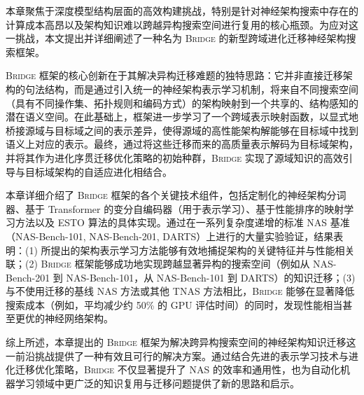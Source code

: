 \documentclass[../main.tex]{subfiles}
\begin{document}
\label{sec:bridge-conclusion}

本章聚焦于深度模型结构层面的高效构建挑战，特别是针对神经架构搜索中存在的计算成本高昂以及架构知识难以跨越异构搜索空间进行复用的核心瓶颈。为应对这一挑战，本文提出并详细阐述了一种名为 \textsc{Bridge} 的新型跨域进化迁移神经架构搜索框架。

\textsc{Bridge} 框架的核心创新在于其解决异构迁移难题的独特思路：它并非直接迁移架构的句法结构，而是通过引入统一的神经架构表示学习机制，将来自不同搜索空间（具有不同操作集、拓扑规则和编码方式）的架构映射到一个共享的、结构感知的潜在语义空间。在此基础上，框架进一步学习了一个跨域表示映射函数，以显式地桥接源域与目标域之间的表示差异，使得源域的高性能架构解能够在目标域中找到语义上对应的表示。最终，通过将这些迁移而来的高质量表示解码为目标域架构，并将其作为进化序贯迁移优化策略的初始种群，\textsc{Bridge} 实现了源域知识的高效引导与目标域架构的自适应进化相结合。

本章详细介绍了 \textsc{Bridge} 框架的各个关键技术组件，包括定制化的神经架构分词器、基于 Transformer 的变分自编码器（用于表示学习）、基于性能排序的映射学习方法以及 ESTO 算法的具体实现。通过在一系列复杂度递增的标准 NAS 基准（NAS-Bench-101, NAS-Bench-201, DARTS）上进行的大量实验验证，结果表明：(1) 所提出的架构表示学习方法能够有效地捕捉架构的关键特征并与性能相关联；(2) \textsc{Bridge} 框架能够成功地实现跨越显著异构的搜索空间（例如从 NAS-Bench-201 到 NAS-Bench-101，从 NAS-Bench-101 到 DARTS）的知识迁移；(3) 与不使用迁移的基线 NAS 方法或其他 TNAS 方法相比，\textsc{Bridge} 能够在显著降低搜索成本（例如，平均减少约 50\% 的 GPU 评估时间）的同时，发现性能相当甚至更优的神经网络架构。

综上所述，本章提出的 \textsc{Bridge} 框架为解决跨异构搜索空间的神经架构知识迁移这一前沿挑战提供了一种有效且可行的解决方案。通过结合先进的表示学习技术与进化迁移优化策略，\textsc{Bridge} 不仅显著提升了 NAS 的效率和通用性，也为自动化机器学习领域中更广泛的知识复用与迁移问题提供了新的思路和启示。
\end{document}
